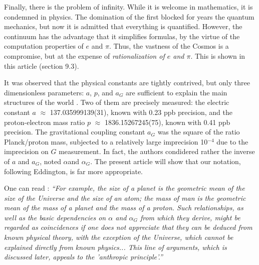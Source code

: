 \documentclass[twoside,draft]{article}
\begin{document}
\begin{sloppypar}




Finally, there is the problem of infinity. While it is welcome in mathematics, it is condemned in physics. The domination of the first blocked for years the quantum mechanics, but now it is admitted that everything is quantified. However, the continuum has the advantage that it simplifies formulas, by the virtue of the computation properties of $e$ and $\pi$. Thus, the vastness of the Cosmos is a compromise, but at the expense of \textit{rationalization of $e$ and $\pi$}. This is shown in this article (section 9.3).

It was observed that the physical constants are tightly contrived, but only three dimensionless parameters: $a$, $p$, and $a_{G}$ are sufficient to explain the main structures of the world \cite{Carr}. Two of them are precisely measured: the electric constant $a$ $\approx$ 137.035999139(31), known with 0.23 ppb precision, and the proton-electron mass ratio $p$ $\approx$ 1836.15267245(75), known with 0.41 ppb precision. The gravitational coupling constant $a_{G}$ was the square of the ratio Planck/proton mass, subjected to a relatively large imprecision 10$^{-4}\!$ due to the imprecision on $G$ measurement. In fact, the authors condidered rather the inverse of $a$ and $a_G$, noted $\alpha$and $\alpha_G$. The present article will show that our notation, following Eddington, is far more appropriate.

One can read \cite{Carr}: \textit{“For example, the size of a planet is the geometric mean of the size of the Universe and the size of an atom; the mass of man is the geometric mean of the mass of a planet and the mass of a proton. Such relationships, as well as the basic dependencies on $\alpha$ and $\alpha_G$ from which they derive, might be regarded as coincidences if one does not appreciate that they can be deduced from known physical theory, with the exception of the Universe, which cannot be explained directly from known physics... This line of arguments, which is discussed later, appeals to the 'anthropic principle'.”}


\end{sloppypar}
\end{document}
